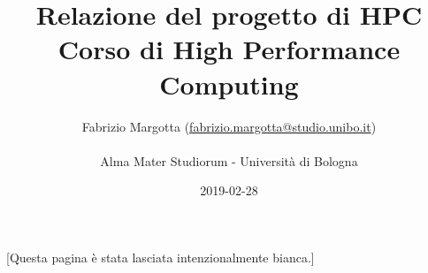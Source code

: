 \documentclass[a4paper]{article}
\begin{document}
\title{Relazione del progetto di HPC\\
     Corso di High Performance Computing}
\author{Fabrizio Margotta
(\href{mailto:fabrizio.margotta@studio.unibo.it}{fabrizio.margotta@studio.unibo.it})\\
	\\
  Alma Mater Studiorum - Università di Bologna\\}
\date{2019-02-28}

\maketitle \thispagestyle{empty}

\newpage \thispagestyle{empty}
\begin{center}
[Questa pagina è stata lasciata intenzionalmente bianca.]
\end{center}
\newpage
\setcounter{tocdepth}{2} %
\tableofcontents \thispagestyle{empty}
\newpage

\pagestyle{headings}





\newpage 
\appendix 

\newpage


%
\end{document}
